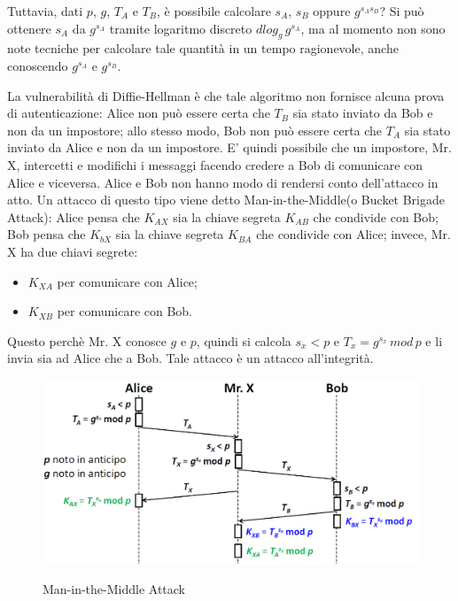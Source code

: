 Tuttavia, dati $p$, $g$, $T_{A}$ e $T_{B}$, è possibile calcolare $s_{A}$, $s_{B}$ oppure $g^{s_{A}s_{B}}$? Si può ottenere $s_{A}$ da $g^{s_{A}}$ tramite logaritmo discreto $dlog_{g} \, g^{s_{A}}$, ma al momento non sono note tecniche per calcolare tale quantità in un tempo ragionevole, anche conoscendo $g^{s_{A}}$ e $g^{s_{B}}$.

La vulnerabilità di Diffie-Hellman è che tale algoritmo non fornisce alcuna prova di autenticazione: Alice non può essere certa che $T_{B}$ sia stato inviato da Bob e non da un impostore; allo stesso modo, Bob non può essere certa che $T_{A}$ sia stato inviato da Alice e non da
un impostore. E' quindi possibile che un impostore, Mr. X, intercetti e modifichi i messaggi facendo credere a Bob di comunicare con Alice e
viceversa. Alice e Bob non hanno modo di rendersi conto dell'attacco in atto. Un attacco di questo tipo viene detto Man-in-the-Middle(o Bucket Brigade Attack): Alice pensa che $K_{AX}$ sia la chiave segreta $K_{AB}$ che condivide con Bob; Bob pensa che $K_{bX}$ sia la chiave segreta $K_{BA}$ che condivide con Alice; invece, Mr. X ha due chiavi segrete: \begin{itemize}
\item $K_{XA}$ per comunicare con Alice;
\item $K_{XB}$ per comunicare con Bob.
\end{itemize}
Questo perchè Mr. X conosce $g$ e $p$, quindi si calcola $s_{x}<p$ e $T_{x}=g^{s_{x}} \, mod \, p$ e li invia sia ad Alice che a Bob. Tale attacco è un attacco all'integrità. 
\begin{figure}[htbp]
	\centering%
	\subfigure%
	{\includegraphics[scale=0.5, keepaspectratio]{Immagini/Capitolo6/DiffieHellman_maninthemiddle.png}}
	\caption{Man-in-the-Middle Attack}
	\end{figure}
	
